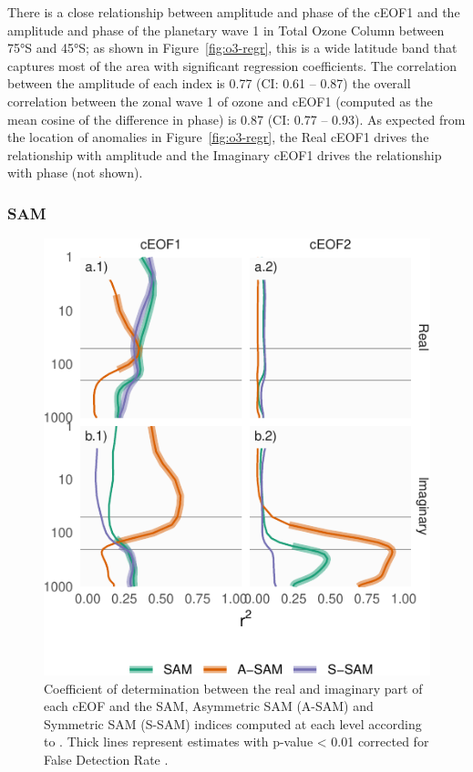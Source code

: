 \documentclass[smallextended]{svjour3}       %
\begin{document}
There is a close relationship between amplitude and phase of the cEOF1 and the amplitude and phase of the planetary wave 1 in Total Ozone Column between 75°S and 45°S; as shown in Figure~\ref{fig:o3-regr}, this is a wide latitude band that captures most of the area with significant regression coefficients. The correlation between the amplitude of each index is 0.77 (CI: 0.61 -- 0.87) the overall correlation between the zonal wave 1 of ozone and cEOF1 (computed as the mean cosine of the difference in phase) is 0.87 (CI: 0.77 -- 0.93). As expected from the location of anomalies in Figure~\ref{fig:o3-regr}, the Real cEOF1 drives the relationship with amplitude and the Imaginary cEOF1 drives the relationship with phase (not shown).

\hypertarget{sam}{%
\subsubsection{SAM}\label{sam}}



\begin{figure}
\centering
\includegraphics{../figures/sam-eof-vertical-1.pdf}
\caption{\label{fig:sam-eof-vertical}Coefficient of determination between the real and imaginary part of each cEOF and the SAM, Asymmetric SAM (A-SAM) and Symmetric SAM (S-SAM) indices computed at each level according to \citet{campitelli2021}. Thick lines represent estimates with p-value \textless{} 0.01 corrected for False Detection Rate \citep{benjamini1995}.}
\end{figure}
\end{document}
